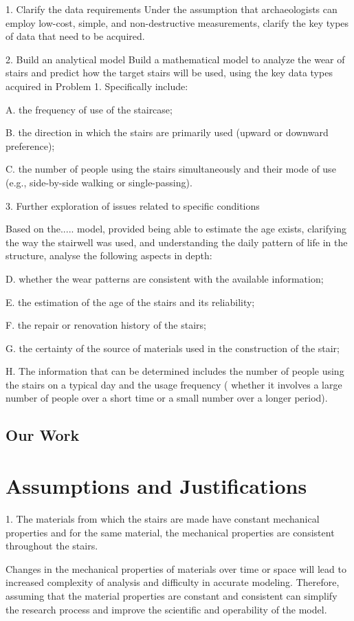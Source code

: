 \documentclass{mcmthesis}
\begin{document}
1. Clarify the data requirements
Under the assumption that archaeologists can employ low-cost, simple, and non-destructive measurements, clarify the key types of data that need to be acquired.

2. Build an analytical model
Build a mathematical model to analyze the wear of stairs and predict how the target stairs will be used, using the key data types acquired in Problem 1. Specifically include:

A. the frequency of use of the staircase;

B. the direction in which the stairs are primarily used (upward or downward preference);

C. the number of people using the stairs simultaneously and their mode of use (e.g., side-by-side walking or single-passing).

3. Further exploration of issues related to specific conditions

Based on the..... model, provided being able to estimate the age exists, clarifying the way the stairwell was used, and understanding the daily pattern of life in the structure, analyse the following aspects in depth:

D. whether the wear patterns are consistent with the available information;

E. the estimation of the age of the stairs and its reliability;

F. the repair or renovation history of the stairs;

G. the certainty of the source of materials used in the construction of the stair;

H. The information that can be determined includes the number of people using the stairs on a typical day and the usage frequency ( whether it involves a large number of people over a short time or a small number over a longer period).


\subsection{Our Work}
\section{Assumptions and Justifications}
1. The materials from which the stairs are made have constant mechanical properties and for the same material, the mechanical properties are consistent throughout the stairs.

Changes in the mechanical properties of materials over time or space will lead to increased complexity of analysis and difficulty in accurate modeling. Therefore, assuming that the material properties are constant and consistent can simplify the research process and improve the scientific and operability of the model.
\end{document}
